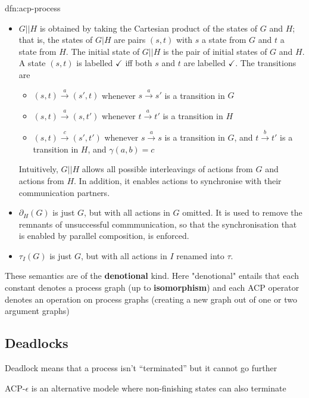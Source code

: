 \documentclass{article}
\begin{document}
\begin{dfn}{dfn:acp-process}{}
\begin{itemize}
            \textbf{root} is labelled with $\checkmark$ if either $I_{G}$ or $I_{H}$ is.
        \item $G | | H$ is obtained by taking the Cartesian product of the states of $G$ and $H$; that is, the states of $G | H$ are pairs $(s, t)$ with $s$ a state from $G$ and $t$ a state from $H$. The initial state of $G | | H$ is the pair of initial states of $G$ and $H$. A state $(s, t)$ is labelled $\checkmark$ iff both $s$ and $t$ are labelled $\checkmark$. The transitions are
            \begin{itemize}
                \item $(s, t) \xrightarrow{a} (s', t)$ whenever $s \xrightarrow{a} s'$ is a transition in $G$
                \item $(s, t) \xrightarrow{a} (s, t')$ whenever $t \xrightarrow{a} t'$ is a transition in $H$
                \item $(s, t) \xrightarrow{c} (s', t')$ whenever $s \xrightarrow{a} s$ is a transition in $G$, and $t \xrightarrow{b} t'$ is a transition in $H$, and $\gamma(a,b) = c$
            \end{itemize}
        Intuitively, $G | | H$ allows all possible interleavings of actions from $G$ and actions from $H$. In addition, it enables actions to synchronise with their communication partners.
        \item $\partial_{H}(G)$ is just $G$, but with all actions in $G$ omitted. It is used to remove the remnants of unsuccessful commmunication, so that the synchronisation that is enabled by parallel composition, is enforced.
        \item $\tau_{I}(G)$ is just $G$, but with all actions in $I$ renamed into $\tau$.
    \end{itemize}
\end{dfn}

These semantics are of the \textbf{denotional} kind. Here "denotional" entails that each constant denotes a process graph (up to \textbf{isomorphism}) and each ACP operator denotes an operation on process graphs (creating a new graph out of one or two argument graphs)

\subsection{Deadlocks}
Deadlock means that a process isn't ``terminated'' but it cannot go further

ACP-$\epsilon$ is an alternative modele where non-finishing states can also terminate


\newpage
\end{document}
